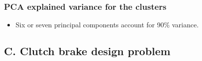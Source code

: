 \documentclass[svgnames, table, smaller]{beamer}
\begin{document}
\begin{frame}
  \frametitle{PCA explained variance for the clusters}
  
  \begin{itemize}
  \item Six or seven principal components account for 90\% variance.
  \end{itemize}

  \begin{figure}[ht]
    \begin{center}
      \label{gtvocevs}
    \end{center}
  \end{figure}


\end{frame}




\subsection{C. Clutch brake design problem}
\end{document}
